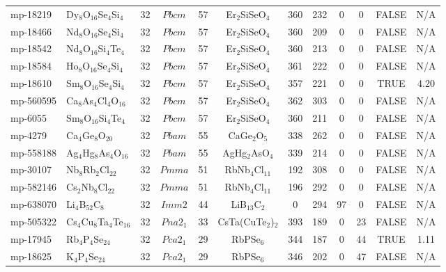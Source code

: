 {\begin{longtable}{llcccccccccc}
    mp-18219 & Dy$_{8}$O$_{16}$Se$_{4}$Si$_{4}$ & 32    & $Pbcm$ & 57    & Er$_{2}$SiSeO$_{4}$ & 360   & 232   & 0     & 0     & FALSE & N/A \\
    mp-18466 & Nd$_{8}$O$_{16}$Se$_{4}$Si$_{4}$ & 32    & $Pbcm$ & 57    & Er$_{2}$SiSeO$_{4}$ & 360   & 209   & 0     & 0     & FALSE & N/A \\
    mp-18542 & Nd$_{8}$O$_{16}$Si$_{4}$Te$_{4}$ & 32    & $Pbcm$ & 57    & Er$_{2}$SiSeO$_{4}$ & 360   & 213   & 0     & 0     & FALSE & N/A \\
    mp-18584 & Ho$_{8}$O$_{16}$Se$_{4}$Si$_{4}$ & 32    & $Pbcm$ & 57    & Er$_{2}$SiSeO$_{4}$ & 361   & 222   & 0     & 0     & FALSE & N/A \\
    mp-18610 & Sm$_{8}$O$_{16}$Se$_{4}$Si$_{4}$ & 32    & $Pbcm$ & 57    & Er$_{2}$SiSeO$_{4}$ & 357   & 221   & 0     & 0     & TRUE  & 4.20  \\
    mp-560595 & Ca$_{8}$As$_{4}$Cl$_{4}$O$_{16}$ & 32    & $Pbcm$ & 57    & Er$_{2}$SiSeO$_{4}$ & 362   & 303   & 0     & 0     & FALSE & N/A \\
    mp-6055 & Sm$_{8}$O$_{16}$Si$_{4}$Te$_{4}$ & 32    & $Pbcm$ & 57    & Er$_{2}$SiSeO$_{4}$ & 360   & 211   & 0     & 0     & FALSE & N/A \\
    mp-4279 & Ca$_{4}$Ge$_{8}$O$_{20}$ & 32    & $Pbam$ & 55    & CaGe$_{2}$O$_{5}$ & 338   & 262   & 0     & 0     & FALSE & N/A \\
    mp-558188 & Ag$_{4}$Hg$_{8}$As$_{4}$O$_{16}$ & 32    & $Pbam$ & 55    & AgHg$_{2}$AsO$_{4}$ & 339   & 214   & 0     & 0     & FALSE & N/A \\
    mp-30107 & Nb$_{8}$Rb$_{2}$Cl$_{22}$ & 32    & $Pmma$ & 51    & RbNb$_{4}$Cl$_{11}$ & 192   & 308   & 0     & 0     & FALSE & N/A \\
    mp-582146 & Cs$_{2}$Nb$_{8}$Cl$_{22}$ & 32    & $Pmma$ & 51    & RbNb$_{4}$Cl$_{11}$ & 196   & 292   & 0     & 0     & FALSE & N/A \\
    mp-638070 & Li$_{4}$B$_{52}$C$_{8}$ & 32    & $Imm2$ & 44    & LiB$_{13}$C$_{2}$ & 0     & 294   & 97    & 0     & FALSE & N/A \\
    mp-505322 & Cs$_{4}$Cu$_{8}$Ta$_{4}$Te$_{16}$ & 32    & $Pna2_1$ & 33    & CsTa(CuTe$_{2}$)$_{2}$ & 393   & 189   & 0     & 23    & FALSE & N/A \\
    mp-17945 & Rb$_{4}$P$_{4}$Se$_{24}$ & 32    & $Pca2_1$ & 29    & RbPSe$_{6}$ & 344   & 187   & 0     & 44    & TRUE  & 1.11  \\
    mp-18625 & K$_{4}$P$_{4}$Se$_{24}$ & 32    & $Pca2_1$ & 29    & RbPSe$_{6}$ & 346   & 202   & 0     & 47    & FALSE & N/A \\

\end{longtable}}
